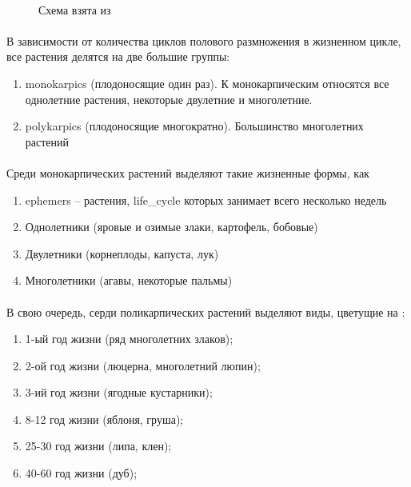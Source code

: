 \begin{figure}[h]
\paragraph*{}Схема взята из \cite{sonin_bio}
\end{figure}


\paragraph*{}В зависимости от количества циклов полового размножения в жизненном цикле, все растения делятся на две большие группы: 

\begin{enumerate}
	\item \gls{monokarpics} (плодоносящие один раз). К монокарпическим относятся все однолетние растения, некоторые двулетние и многолетние.
	\item \gls{polykarpics} (плодоносящие многократно). Большинство многолетних растений
\end{enumerate}

\paragraph*{}Среди монокарпических растений выделяют такие жизненные формы, как

\begin{enumerate}
	\item \gls{ephemers} -- растения, \gls{life_cycle} которых занимает всего несколько недель
	\item Однолетники (яровые и озимые злаки, картофель, бобовые)
	\item Двулетники (корнеплоды, капуста, лук)
	\item Многолетники (агавы, некоторые пальмы)
\end{enumerate} 

\paragraph*{}В свою очередь, серди поликарпических растений выделяют виды, цветущие на \cite{rubin_71}:

\begin{enumerate}
	\item 1-ый год жизни (ряд многолетних злаков);
	\item 2-ой год жизни (люцерна, многолетний люпин);
	\item 3-ий год жизни (ягодные кустарники);
	\item 8-12 год жизни (яблоня, груша);
	\item 25-30 год жизни (липа, клен);
	\item 40-60 год жизни (дуб);
\end{enumerate}

